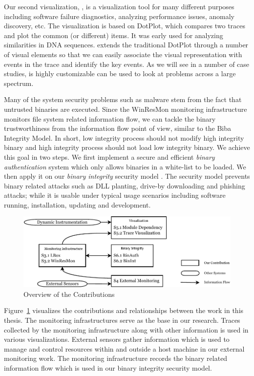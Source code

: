Our second visualization,  \cite{wu2010visualizing},
is a visualization tool for many different purposes including
software failure diagnostics,
analyzing performance issues, anomaly discovery, etc.
The visualization is based on DotPlot, which compares two traces
and plot the common (or different) items.
It was early used for
analyzing similarities in DNA sequences.
 extends the traditional DotPlot through a number of visual elements
so that we can easily associate the visual representation with events in the
trace and identify the key events.
As we will see in a number of case studies,
 is highly customizable can be used to look at problems
across a large spectrum.

Many of the system security problems such as malware stem from the fact that
untrusted binaries are executed.
Since the WinResMon monitoring infrastructure monitors file system related information flow,
we can tackle the binary trustworthiness from the information
flow point of view, similar to the Biba Integrity Model.
In short, low integrity process should not modify high integrity binary and
high integrity process should not load low integrity binary.
We achieve this goal in two steps.
We first implement a secure and efficient {\em binary authentication} system
\cite{halim2008lightweight,wu2009esi}
which only allows binaries in a white-list to be loaded.
We then apply it on our {\em binary integrity} security model
\cite{wu2010pub,wu2011towards}.
The security model prevents binary related attacks such as DLL planting,
drive-by downloading and phishing attacks;
while it is usable under typical usage scenarios including
software running, installation, updating and development.

\begin{figure}[htb]
\centering
\includegraphics[width=1.0\textwidth]{overview.pdf}
\caption{Overview of the Contributions}
\label{fig:overview}
\end{figure}

Figure~\ref{fig:overview} visualizes the contributions and relationships between
the work in this thesis.
The monitoring infrastructures serve as the base in our research.
Traces collected by the monitoring infrastructure along with other information is used
in various visualizations.
External sensors gather information which is used to manage and control resources within and outside
a host machine in our external monitoring work.
The monitoring infrastructure records the binary related information flow
which is used in our binary integrity security model.

